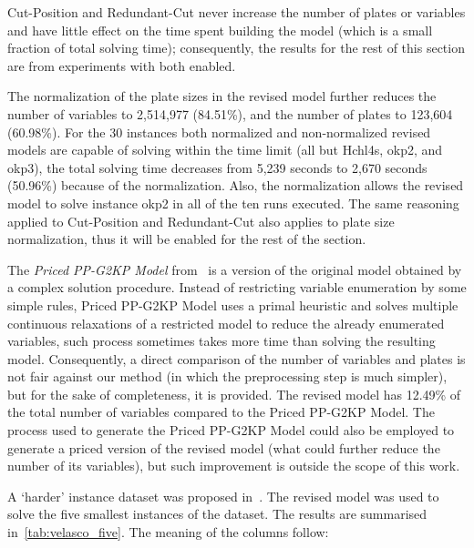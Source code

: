 Cut-Position and Redundant-Cut never increase the number of plates or variables and have little effect on the time spent building the model (which is a small fraction of total solving time); consequently, the results for the rest of this section are from experiments with both enabled.

The normalization of the plate sizes in the revised model further reduces the number of variables to 2,514,977 (84.51\%), and the number of plates to 123,604 (60.98\%).
For the 30 instances both normalized and non-normalized revised models are capable of solving within the time limit (all but Hchl4s, okp2, and okp3), the total solving time decreases from 5,239 seconds to 2,670 seconds (50.96\%) because of the normalization.
Also, the normalization allows the revised model to solve instance okp2 in all of the ten runs executed.
The same reasoning applied to Cut-Position and Redundant-Cut also applies to plate size normalization, thus it will be enabled for the rest of the section.

The \emph{Priced PP-G2KP Model} from~\cite{furini:2016} is a version of the original model obtained by a complex solution procedure.
Instead of restricting variable enumeration by some simple rules, Priced PP-G2KP Model uses a primal heuristic and solves multiple continuous relaxations of a restricted model to reduce the already enumerated variables, such process sometimes takes more time than solving the resulting model.
Consequently, a direct comparison of the number of variables and plates is not fair against our method (in which the preprocessing step is much simpler), but for the sake of completeness, it is provided.
The revised model has 12.49\% of the total number of variables compared to the Priced PP-G2KP Model.
The process used to generate the Priced PP-G2KP Model could also be employed to generate a priced version of the revised model (what could further reduce the number of its variables), but such improvement is outside the scope of this work.

A `harder' instance dataset was proposed in~\cite{velasco:2019}.
The revised model was used to solve the five smallest instances of the dataset.
The results are summarised in~\autoref{tab:velasco_five}. The meaning of the columns follow:

